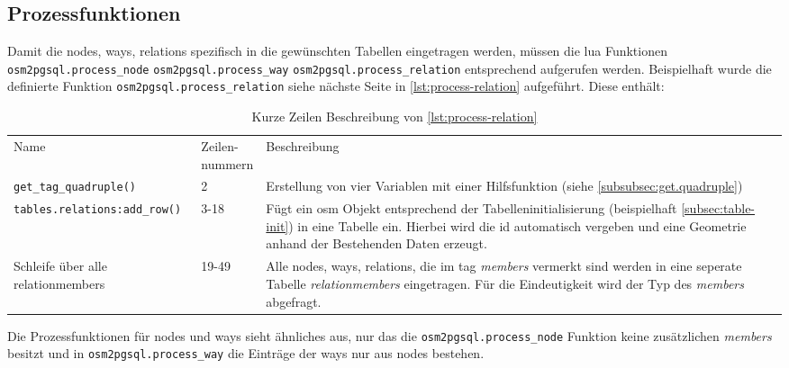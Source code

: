 \subsection{Prozessfunktionen}
Damit die nodes, ways, relations spezifisch in die gewünschten Tabellen eingetragen werden, müssen die lua Funktionen \lstinline|osm2pgsql.process_node| \lstinline|osm2pgsql.process_way| \lstinline|osm2pgsql.process_relation| entsprechend aufgerufen werden. Beispielhaft wurde die definierte Funktion \lstinline|osm2pgsql.process_relation| siehe nächste Seite in \autoref{lst:process-relation} aufgeführt.
Diese enthält:
\begin{table}[h]
	\caption{Kurze Zeilen Beschreibung von \autoref{lst:process-relation}}
	\renewcommand{\arraystretch}{1.5}
	\begin{tabularx}{\linewidth}{|l|l|X|}\hline
		Name & \multirow{2}{*}{\parbox{1.6cm}{Zeilen-\\ nummern}} & Beschreibung\\
		&& \\\hline
		\lstinline|get_tag_quadruple()| & 2 & Erstellung von vier Variablen mit einer Hilfsfunktion (siehe \autoref{subsubsec:get.quadruple})\\\hline
		\lstinline|tables.relations:add_row()| & 3-18 & Fügt ein osm Objekt entsprechend der Tabelleninitialisierung (beispielhaft \autoref{subsec:table-init}) in eine Tabelle ein. \newline Hierbei wird die id automatisch vergeben und eine Geometrie anhand der Bestehenden Daten erzeugt.\\\hline
		Schleife über alle relationmembers & 19-49 & Alle nodes, ways, relations, die im tag \textit{members} vermerkt sind werden in eine seperate Tabelle \textit{relationmembers} eingetragen. Für die Eindeutigkeit wird der Typ des \textit{members} abgefragt. \\\hline
	\end{tabularx}
\end{table}

Die Prozessfunktionen für nodes und ways sieht ähnliches aus, nur das die \lstinline|osm2pgsql.process_node| Funktion keine zusätzlichen \textit{members} besitzt und in \lstinline|osm2pgsql.process_way| die Einträge der ways nur aus nodes bestehen.

